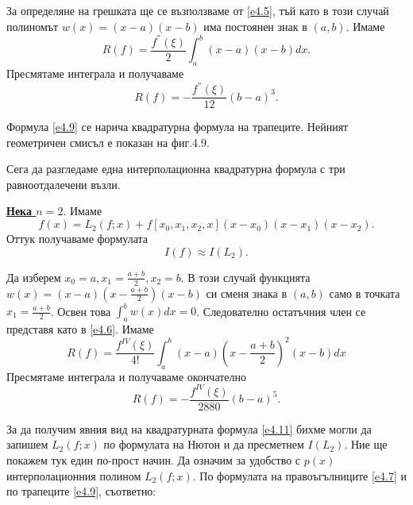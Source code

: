 \documentclass[12pt]{article}
\numberwithin{equation}{section}
\numberwithin{theorem}{section}
\numberwithin{definition}{section}
\numberwithin{corollary}{section}
\begin{document}
За определяне на грешката ще се възползваме от \ref{e4.5}, тъй като в този случай полиномът $w(x) = (x-a)(x-b)$ има постоянен знак в $(a,b)$. Имаме
\[
R(f) = \frac{f^{''}(\xi)}{2}\int_a^b(x-a)(x-b)dx.
\]
Пресмятаме интеграла и получаваме
\begin{equation}\label{e4.10}
R(f) = -\frac{f^{''}(\xi)}{12}(b-a)^3.
\end{equation}
\par
Формула \ref{e4.9} се нарича квадратурна формула на трапеците. Нейният геометричен смисъл е показан на фиг.4.9.
\begin{center}
\end{center}
\par
Сега да разгледаме една интерполационна квадратурна формула с три равноотдалечени възли.
\par
\underline{\textbf{Нека $n=2$}}. Имаме
\[
f(x)=L_2(f;x)+f[x_0,x_1,x_2,x](x-x_0)(x-x_1)(x-x_2).
\]
Оттук получаваме формулата
\begin{equation}\label{e4.11}
I(f)\approx I(L_2).
\end{equation}
\par
Да изберем $x_0=a,x_1=\frac{a+b}{2},x_2=b$. В този случай функцията $w(x)=(x-a)\left(x-\frac{a+b}{2}\right)(x-b)$ си сменя знака в $(a,b)$ само в точката $x_1 = \frac{a+b}{2}$. Освен това $\int_a^bw(x)dx=0$. Следователно остатъчния член се представя като в \ref{e4.6}. Имаме
\[
R(f) = \frac{f^{IV}(\xi)}{4!}\int_a^b(x-a)\left(x-\frac{a+b}{2}\right)^2(x-b)dx
\]
Пресмятаме интеграла и получаваме окончателно
\begin{equation}\label{e4.12}
R(f) = -\frac{f^{IV}(\xi)}{2880}(b-a)^5.
\end{equation}
\par
За да получим явния вид на квадратурната формула \ref{e4.11} бихме могли да запишем $L_2(f;x)$  по формулата на Нютон и да пресметнем $I(L_2)$. Ние ще покажем тук един по-прост начин. Да означим за удобство с $p(x)$ интерполационния полином $L_2(f;x)$. По формулата на правоъгълниците \ref{e4.7} и по трапеците \ref{e4.9}, съответно:
\end{document}

